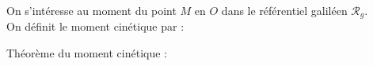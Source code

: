 ﻿\documentclass[a4paper]{article}
\begin{document}
\pagestyle{fancy}
\fancyhf{}
\setlength{\headheight}{15pt}

\begin{center}
	\large{}
\end{center}


On s'intéresse au moment du point \(M\) en \(O\) dans le référentiel galiléen \(\mathcal{R}_g\). \\
On définit le moment cinétique par :
\begin{center}
\end{center}

Théorème du moment cinétique :
\begin{center}
\end{center}
\end{document}
